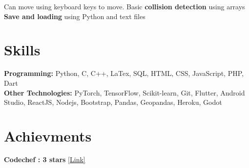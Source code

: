 \documentclass[]{Nikhil_Kadiyan_Resume}
\begin{document}
\pt Can move using keyboard keys to move. Basic \textbf{collision detection} using arrays \\
\pt \textbf{Save and loading} using Python and text files \\
\sectionsep

\section{Skills} 
\hrulefill

\pt \textbf{Programming:} Python, C, C++, LaTex, SQL, HTML, CSS, JavaScript, PHP, Dart \\
\pt \textbf{Other Technologies:} PyTorch, TensorFlow, Scikit-learn, Git, Flutter, Android Studio, ReactJS, Nodejs, Bootstrap, Pandas, Geopandas, Heroku, Godot

\sectionsep

\section{Achievments} 
\hrulefill

\pt \textbf{Codechef : 3 stars} \href{https://www.codechef.com/users/nikhilcad}{[Link]} \\

\sectionsep




\end{document}
